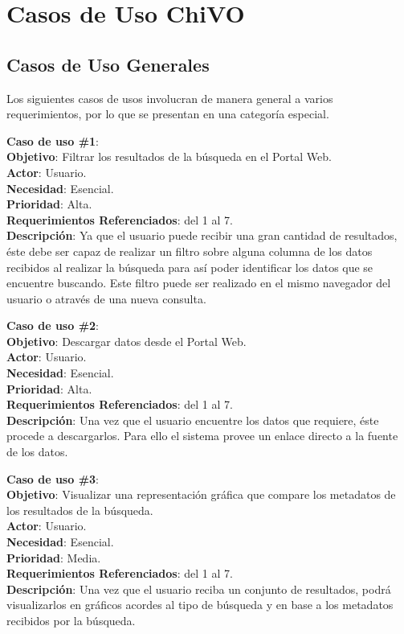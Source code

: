 \section{Casos de Uso ChiVO}
\subsection{Casos de Uso Generales}
Los siguientes casos de usos involucran de manera general a varios
requerimientos, por lo que se presentan en una categoría especial. 

\noindent\textbf{Caso de uso \#1}: \\
\textbf{Objetivo}: Filtrar los resultados de la búsqueda en el Portal Web. \\
\textbf{Actor}: Usuario. \\
\textbf{Necesidad}: Esencial. \\
\textbf{Prioridad}: Alta. \\
\textbf{Requerimientos Referenciados}: del 1 al 7. \\
\textbf{Descripción}: Ya que el usuario puede recibir una gran cantidad de
resultados, éste debe ser capaz de realizar un filtro sobre alguna columna de
los datos recibidos al realizar la búsqueda para así poder identificar los
datos que se encuentre buscando. Este filtro puede ser realizado en el mismo
navegador del usuario o através de una nueva consulta. 
\vspace{1.0cm}

\noindent\textbf{Caso de uso \#2}: \\
\textbf{Objetivo}: Descargar datos desde el Portal Web. \\
\textbf{Actor}: Usuario. \\
\textbf{Necesidad}: Esencial. \\
\textbf{Prioridad}: Alta. \\
\textbf{Requerimientos Referenciados}: del 1 al 7. \\
\textbf{Descripción}: Una vez que el usuario encuentre los datos que requiere, éste procede a descargarlos. Para ello el sistema provee un enlace directo a la fuente de los datos.
\vspace{1.0cm}

\noindent\textbf{Caso de uso \#3}: \\
\textbf{Objetivo}: Visualizar una representación gráfica que compare los metadatos de los resultados de la búsqueda. \\
\textbf{Actor}: Usuario. \\
\textbf{Necesidad}: Esencial. \\
\textbf{Prioridad}:  Media. \\
\textbf{Requerimientos Referenciados}: del 1 al 7. \\
\textbf{Descripción}: Una vez que el usuario reciba un conjunto de resultados, podrá visualizarlos en gráficos acordes al tipo de búsqueda y en base a los metadatos recibidos por la búsqueda.
\vspace{1.0cm}

